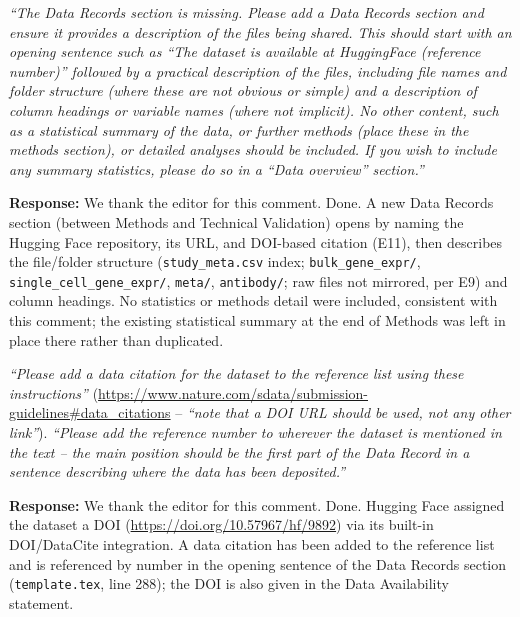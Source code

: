 \documentclass[11pt]{article}
\newcommand{\origcomment}[1]{\textit{``#1''}}
\newcommand{\filledresponse}[1]{%
  \par\medskip\noindent\textbf{Response:} #1\par
  \vspace{0.4cm}%
  \par\noindent\hrulefill\par\bigskip
}
\begin{document}
\begin{commentlist}
\item[E10.] \origcomment{The Data Records section is missing. Please add a Data Records section
and ensure it provides a description of the files being shared. This should start with an opening
sentence such as ``The dataset is available at HuggingFace (reference number)'' followed by a
practical description of the files, including file names and folder structure (where these are
not obvious or simple) and a description of column headings or variable names (where not
implicit). No other content, such as a statistical summary of the data, or further methods (place
these in the methods section), or detailed analyses should be included. If you wish to include
any summary statistics, please do so in a ``Data overview'' section.}
\filledresponse{We thank the editor for this comment. Done. A new Data Records section (between Methods and Technical Validation) opens
by naming the Hugging Face repository, its URL, and DOI-based citation (E11), then describes the
file/folder structure (\texttt{study\_meta.csv} index; \texttt{bulk\_gene\_expr/},
\texttt{single\_cell\_gene\_expr/}, \texttt{meta/}, \texttt{antibody/}; raw files not mirrored, per
E9) and column headings. No statistics or methods detail were included, consistent with this
comment; the existing statistical summary at the end of Methods was left in place there rather than
duplicated.}

\item[E11.] \origcomment{Please add a data citation for the dataset to the reference list using
these instructions} (\url{https://www.nature.com/sdata/submission-guidelines#data_citations}
-- \origcomment{note that a DOI URL should be used, not any other link}).
\origcomment{Please add the reference number to wherever the dataset is mentioned in the text --
the main position should be the first part of the Data Record in a sentence describing where the
data has been deposited.}
\filledresponse{We thank the editor for this comment. Done. Hugging Face assigned the dataset a DOI (\url{https://doi.org/10.57967/hf/9892})
via its built-in DOI/DataCite integration. A data citation has been added to the reference list and
is referenced by number in the opening sentence of the Data Records section
(\texttt{template.tex}, line 288); the DOI is also given in the Data Availability statement.}


\end{commentlist}
\end{document}
